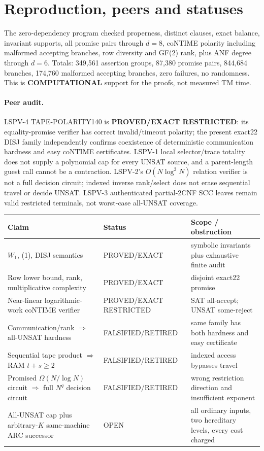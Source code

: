 \documentclass[11pt]{article}
\begin{document}
\section{Reproduction, peers and statuses}
The zero-dependency program checked properness, distinct clauses, exact balance, invariant supports, all promise pairs through \(d=8\), coNTIME polarity including malformed accepting branches, row diversity and GF(2) rank, plus ANF degree through \(d=6\). Totals: 349,561 assertion groups, 87,380 promise pairs, 844,684 branches, 174,760 malformed accepting branches, zero failures, no randomness. This is \textbf{COMPUTATIONAL} support for the proofs, not measured TM time.

\paragraph{Peer audit.}
LSPV-4 TAPE-POLARITY140 is \textbf{PROVED/EXACT RESTRICTED}: its equality-promise verifier has correct invalid/timeout polarity; the present exact22 DISJ family independently confirms coexistence of deterministic communication hardness and easy coNTIME certificates. LSPV-1 local selector/trace totality does not supply a polynomial cap for every UNSAT source, and a parent-length guest call cannot be a contraction. LSPV-2's \(O(N\log^3N)\) relation verifier is not a full decision circuit; indexed inverse rank/select does not erase sequential travel or decide UNSAT. LSPV-3 authenticated partial-2CNF SCC leaves remain valid restricted terminals, not worst-case all-UNSAT coverage.

\begin{center}\small
\begin{tabularx}{.99\linewidth}{p{.45\linewidth}p{.19\linewidth}X}\toprule
Claim & Status & Scope / obstruction\\\midrule
\(W_1\), (1), DISJ semantics & PROVED/EXACT & symbolic invariants plus exhaustive finite audit\\
Row lower bound, rank, multiplicative complexity & PROVED/EXACT & disjoint exact22 promise\\
Near-linear logarithmic-work coNTIME verifier & PROVED/EXACT RESTRICTED & SAT all-accept; UNSAT some-reject\\
Communication/rank \(\Rightarrow\) all-UNSAT hardness & FALSIFIED/RETIRED & same family has both hardness and easy certificate\\
Sequential tape product \(\Rightarrow\) RAM \(t+s\ge2\) & FALSIFIED/RETIRED & indexed access bypasses travel\\
Promised \(\Omega(N/\log N)\) circuit \(\Rightarrow\) full \(N^q\) decision circuit & FALSIFIED/RETIRED & wrong restriction direction and insufficient exponent\\
All-UNSAT cap plus arbitrary-\(K\) same-machine ARC successor & OPEN & all ordinary inputs, two hereditary levels, every cost charged\\\bottomrule
\end{tabularx}
\end{center}
\end{document}
